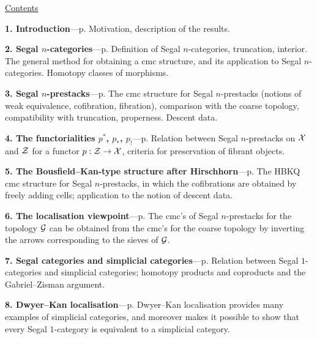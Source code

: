 \newpage

\begin{center}
{\Large \underline{Contents}}
\end{center}

\noindent
{\bf 1. Introduction}---p. \pageref{intropage}
\newline
{\small
Motivation, description of the results.
}

\noindent
{\bf 2. Segal $n$-categories}---p. \pageref{ncatsegpage}
\newline
{\small
Definition of Segal $n$-categories, truncation, interior. The general
method for obtaining a cmc structure, and its application to Segal
$n$-categories. Homotopy classes of morphisms.}

\noindent
{\bf 3. Segal $n$-prestacks}---p. \pageref{nchampsegpage}
\newline
{\small
The cmc structure for Segal $n$-prestacks (notions of weak equivalence,
cofibration, fibration), comparison with the coarse topology, compatibility
with truncation, properness. Descent data.}

\noindent
{\bf 4. The functorialities $p^{\ast}$, $p_{\ast}$, $p_!$}---p.
\pageref{fonctorialitepage}
\newline
{\small
Relation between Segal $n$-prestacks on ${\cal X}$ and ${\cal Z}$ for a functor
$p:{\cal Z}\rightarrow {\cal X}$, criteria for preservation of fibrant objects.}

\noindent
{\bf 5. The Bousfield--Kan-type structure after Hirschhorn}---p.
\pageref{bousfieldkanpage}
\newline
{\small
The HBKQ cmc structure for Segal $n$-prestacks, in which the cofibrations
are obtained by freely adding cells; application to the notion of descent
data.}

\noindent
{\bf 6. The localisation viewpoint}---p.
\pageref{localisationpage}
\newline
{\small
The cmc's of Segal $n$-prestacks for the topology ${\cal G}$ can be obtained
from the cmc's for the coarse topology by inverting the arrows corresponding
to the sieves of ${\cal G}$.}

\noindent
{\bf 7. Segal categories and simplicial categories}---p.
\pageref{segsimplpage}
\newline
{\small
Relation between Segal $1$-categories and simplicial categories; homotopy
products and coproducts and the Gabriel--Zisman argument.}

\noindent
{\bf 8. Dwyer--Kan localisation}---p.
\pageref{dwyerkanpage}
\newline
{\small
Dwyer--Kan localisation provides many examples of simplicial categories,
and moreover makes it possible to show that every Segal $1$-category is
equivalent to a simplicial category.}

